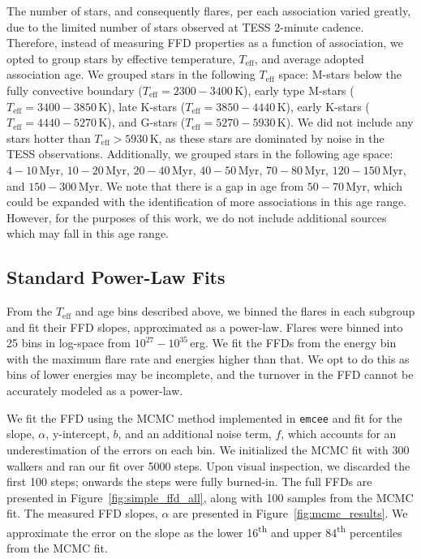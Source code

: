 \documentclass[twocolumn]{aastex631}
\begin{document}
The number of stars, and consequently flares, per each association varied greatly,
due to the limited number of stars observed at TESS 2-minute cadence. Therefore, instead
of measuring FFD properties as a function of association, we opted to group stars
by effective temperature, $T_\textrm{eff}$, and average adopted association age. We
grouped stars in the following $T_\textrm{eff}$ space: M-stars below the fully
convective boundary ($T_\textrm{eff} = 2300 - 3400$\,K), early type M-stars
($T_\textrm{eff} = 3400 - 3850$\,K), late K-stars ($T_\textrm{eff} = 3850 - 4440$\,K),
early K-stars ($T_\textrm{eff} = 4440 - 5270$\,K), and G-stars ($T_\textrm{eff} = 5270 - 5930$\,K).
We did not include any stars hotter than $T_\textrm{eff} > 5930$\,K, as these stars
are dominated by noise in the TESS observations. Additionally, we grouped stars
in the following age space: $4-10$\,Myr, $10-20$\,Myr, $20-40$\,Myr, $40-50$\,Myr,
$70-80$\,Myr, $120-150$\,Myr, and $150-300$\,Myr. We note that there is a gap in
age from $50-70$\,Myr, which could be expanded with the identification of more
associations in this age range. However, for the purposes of this work, we do not
include additional sources which may fall in this age range.


\subsection{Standard Power-Law Fits}\label{subsec:stats}

From the $T_\textrm{eff}$ and age bins described above, we binned the flares in each
subgroup and fit their FFD slopes, approximated as a power-law. Flares were binned
into 25 bins in log-space from $10^{27} - 10^{35}$\,erg. We fit the FFDs from the
energy bin with the maximum flare rate and energies higher than that. We opt to do
this as bins of lower energies may be incomplete, and the turnover in the FFD cannot
be accurately modeled as a power-law.

We fit the FFD using the MCMC method implemented in \texttt{emcee} \citep{goodman10, emcee}
and fit for the slope, $\alpha$, y-intercept, $b$, and an additional noise term, $f$, which
accounts for an underestimation of the errors on each bin. We initialized the MCMC fit with
300 walkers and ran our fit over 5000 steps. Upon visual inspection, we discarded the
first 100 steps; onwards the steps were fully burned-in. The full FFDs are presented
in Figure~\ref{fig:simple_ffd_all}, along with 100 samples from the MCMC fit. The measured
FFD slopes, $\alpha$ are presented in Figure~\ref{fig:mcmc_results}. We approximate the
error on the slope as the lower 16\textsuperscript{th} and upper 84\textsuperscript{th}
percentiles from the MCMC fit.
\end{document}
